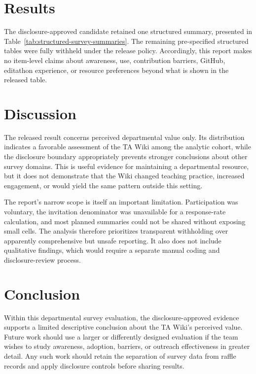 \documentclass[11pt]{article}
\begin{document}
\section{Results}

The disclosure-approved candidate retained one structured summary, presented in
Table~\ref{tab:structured-survey-summaries}. The remaining pre-specified
structured tables were fully withheld under the release policy. Accordingly,
this report makes no item-level claims about awareness, use, contribution
barriers, GitHub, editathon experience, or resource preferences beyond what is
shown in the released table.



\section{Discussion}

The released result concerns perceived departmental value only. Its distribution
indicates a favorable assessment of the TA Wiki among the analytic cohort, while
the disclosure boundary appropriately prevents stronger conclusions about other
survey domains. This is useful evidence for maintaining a departmental resource,
but it does not demonstrate that the Wiki changed teaching practice, increased
engagement, or would yield the same pattern outside this setting.

The report's narrow scope is itself an important limitation. Participation was
voluntary, the invitation denominator was unavailable for a response-rate
calculation, and most planned summaries could not be shared without exposing
small cells. The analysis therefore prioritizes transparent withholding over
apparently comprehensive but unsafe reporting. It also does not include
qualitative findings, which would require a separate manual coding and
disclosure-review process.

\section{Conclusion}

Within this departmental survey evaluation, the disclosure-approved evidence supports
a limited descriptive conclusion about the TA Wiki's perceived value. Future
work should use a larger or differently designed evaluation if the team wishes
to study awareness, adoption, barriers, or outreach effectiveness in greater
detail. Any such work should retain the separation of survey data from raffle
records and apply disclosure controls before sharing results.
\end{document}
